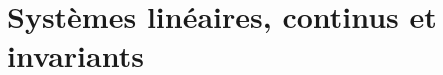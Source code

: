 \chapter[Systèmes linéaires, continus\ldots]
        {Systèmes linéaires, continus et invariants \label{chap-slci}}
\adjustmtc
\minitoc
\thispagestyle{plain}
\newpage
